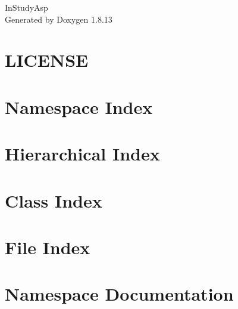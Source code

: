 \documentclass[twoside]{book}
\newcommand{\+}{\discretionary{\mbox{\scriptsize$\hookleftarrow$}}{}{}}
\newcommand{\clearemptydoublepage}{%
  \newpage{\pagestyle{empty}\cleardoublepage}%
}
\begin{document}
\hypersetup{pageanchor=false,
             bookmarksnumbered=true,
             pdfencoding=unicode
            }
\begin{titlepage}
\vspace*{7cm}
\begin{center}%
{\Large In\+Study\+Asp }\\
\vspace*{1cm}
{\large Generated by Doxygen 1.8.13}\\
\end{center}
\end{titlepage}
\clearemptydoublepage
{}
\tableofcontents
\clearemptydoublepage
{}
\hypersetup{pageanchor=true}

\chapter{L\+I\+C\+E\+N\+SE}
\label{md__d_1___w_o_r_k___s_t_e_p__in_study_asp_packages__newtonsoft_8_json_810_80_83__l_i_c_e_n_s_e}

\chapter{Namespace Index}

\chapter{Hierarchical Index}

\chapter{Class Index}

\chapter{File Index}

\chapter{Namespace Documentation}













\end{document}
